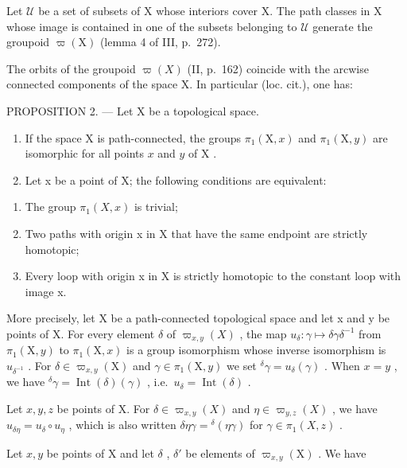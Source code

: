 Let \(\mathcal{U}\) be a set of subsets of X whose interiors cover X. The path classes in X whose image is contained in one of the subsets belonging to \(\mathcal{U}\) generate the groupoid \(\varpi(\mathrm{X})\) (lemma 4 of III, p.~272).

The orbits of the groupoid \(\varpi(X)\) (II, p.~162) coincide with the arcwise connected components of the space X. In particular (loc. cit.), one has:

PROPOSITION 2. --- Let X be a topological space.

\begin{enumerate}
\def\labelenumi{\alph{enumi})}
\item
  If the space X is path-connected, the groups \(\pi_1(\mathrm{X},x)\) and \(\pi_1(\mathrm{X},y)\) are isomorphic for all points \(x\) and \(y\) of \(\mathrm{X}\) .
\item
  Let x be a point of X; the following conditions are equivalent:
\end{enumerate}

\begin{enumerate}
\def\labelenumi{(\roman{enumi})}
\item
  The group \(\pi_1(X,x)\) is trivial;
\item
  Two paths with origin x in X that have the same endpoint are strictly homotopic;
\item
  Every loop with origin x in X is strictly homotopic to the constant loop with image x.
\end{enumerate}

More precisely, let X be a path-connected topological space and let x and y be points of X. For every element \(\delta\) of \(\varpi_{x,y}(X)\) , the map \(u_{\delta} \colon \gamma \mapsto \delta \gamma \delta^{-1}\) from \(\pi_1(\mathrm{X},y)\) to \(\pi_1(\mathrm{X},x)\) is a group isomorphism whose inverse isomorphism is \(u_{\delta^{-1}}\) . For \(\delta \in \varpi_{x,y}(\mathrm{X})\) and \(\gamma \in \pi_1(\mathrm{X},y)\) we set \(^{\delta}\gamma = u_{\delta}(\gamma)\) . When \(x = y\) , we have \(^{\delta}\gamma = \operatorname{Int}(\delta)(\gamma)\) , i.e.~\(u_{\delta} = \operatorname{Int}(\delta)\) .

Let \(x, y, z\) be points of X. For \(\delta \in \varpi_{x,y}(X)\) and \(\eta \in \varpi_{y,z}(X)\) , we have \(u_{\delta \eta} = u_{\delta} \circ u_{\eta}\) , which is also written \(\delta \eta \gamma = {}^{\delta}(\eta \gamma)\) for \(\gamma \in \pi_1(X, z)\) .

Let \(x, y\) be points of X and let \(\delta\) , \(\delta'\) be elements of \(\varpi_{x,y}(\mathrm{X})\) . We have

